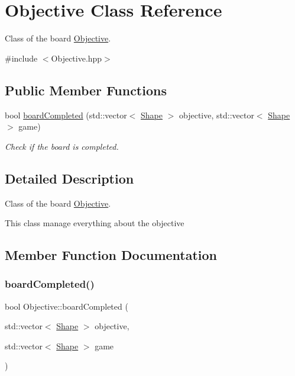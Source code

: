 \hypertarget{classObjective}{}\section{Objective Class Reference}
\label{classObjective}


Class of the board \hyperlink{classObjective}{Objective}.  




{\ttfamily \#include $<$Objective.\+hpp$>$}

\subsection*{Public Member Functions}
\begin{DoxyCompactItemize}
\item 
bool \hyperlink{classObjective_aeaba740e91d6ff0c44998e41c29394b0}{board\+Completed} (std\+::vector$<$ \hyperlink{classShape}{Shape} $>$ objective, std\+::vector$<$ \hyperlink{classShape}{Shape} $>$ game)
\begin{DoxyCompactList}\small\item\em Check if the board is completed. \end{DoxyCompactList}\end{DoxyCompactItemize}


\subsection{Detailed Description}
Class of the board \hyperlink{classObjective}{Objective}. 

This class manage everything about the objective 

\subsection{Member Function Documentation}
\mbox{\label{classObjective_aeaba740e91d6ff0c44998e41c29394b0}} 
\subsubsection{\texorpdfstring{board\+Completed()}{boardCompleted()}}
{\footnotesize\ttfamily bool Objective\+::board\+Completed (\begin{DoxyParamCaption}\item[{std\+::vector$<$ \hyperlink{classShape}{Shape} $>$}]{objective,  }\item[{std\+::vector$<$ \hyperlink{classShape}{Shape} $>$}]{game }\end{DoxyParamCaption})}



